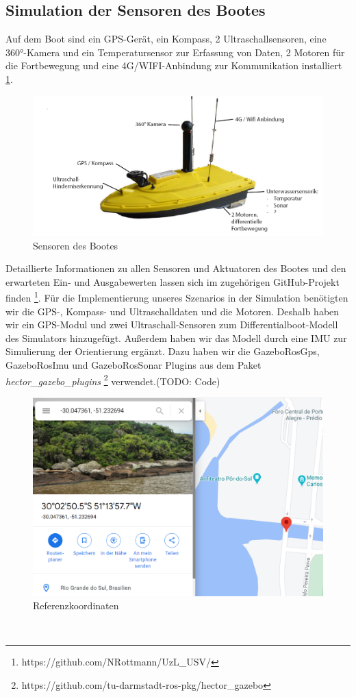 \documentclass[conference]{IEEEtran}
\begin{document}
\subsection{Simulation der Sensoren des Bootes}
Auf dem Boot sind ein GPS-Gerät, ein Kompass, 2 Ultraschallsensoren, eine 360°-Kamera und ein Temperatursensor zur Erfassung von Daten, 2 Motoren für die Fortbewegung und eine 4G/WIFI-Anbindung zur Kommunikation installiert \ref{boot}.\\
\begin{figure}
	\includegraphics[width=\linewidth]{boot.png}
	\caption{Sensoren des Bootes}
	\label{boot}
\end{figure}
Detaillierte Informationen zu allen Sensoren und Aktuatoren des Bootes und den erwarteten Ein- und Ausgabewerten lassen sich im zugehörigen GitHub-Projekt finden \footnote{https://github.com/NRottmann/UzL\_USV/}.
Für die Implementierung unseres Szenarios in der Simulation benötigten wir die GPS-, Kompass- und Ultraschalldaten und die Motoren. Deshalb haben wir ein GPS-Modul und zwei Ultraschall-Sensoren zum Differentialboot-Modell des Simulators hinzugefügt. Außerdem haben wir das Modell durch eine IMU zur Simulierung der Orientierung ergänzt. Dazu haben wir die GazeboRosGps, GazeboRosImu und GazeboRosSonar Plugins aus dem Paket \textit{hector\_gazebo\_plugins}  \footnote{https://github.com/tu-darmstadt-ros-pkg/hector\_gazebo} verwendet.(TODO: Code)\\
\begin{figure}
	\includegraphics[width=\linewidth]{reference.png}
	\caption{Referenzkoordinaten}
	\label{reference}
\end{figure}\\
\end{document}
